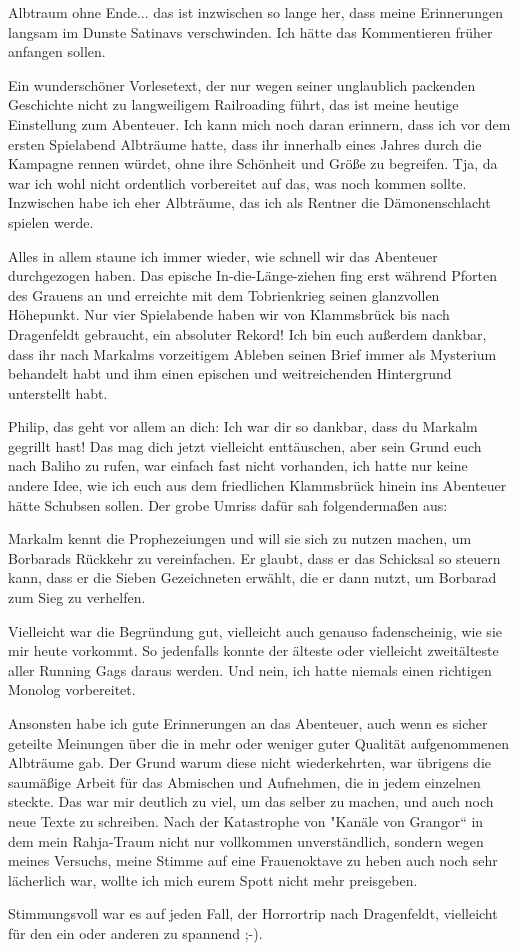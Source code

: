 \documentclass[11pt]{scrreprt}
\begin{document}
Albtraum ohne Ende... das ist inzwischen so lange her, dass meine Erinnerungen langsam im Dunste Satinavs verschwinden. Ich hätte das Kommentieren früher anfangen sollen.\par
Ein wunderschöner Vorlesetext, der nur wegen seiner unglaublich packenden Geschichte nicht zu langweiligem Railroading führt, das ist meine heutige Einstellung zum Abenteuer. Ich kann mich noch daran erinnern, dass ich vor dem ersten Spielabend Albträume hatte, dass ihr innerhalb eines Jahres durch die Kampagne rennen würdet, ohne ihre Schönheit und Größe zu begreifen. Tja, da war ich wohl nicht ordentlich vorbereitet auf das, was noch kommen sollte. Inzwischen habe ich eher Albträume, das ich als Rentner die Dämonenschlacht spielen werde.\par
Alles in allem staune ich immer wieder, wie schnell wir das Abenteuer durchgezogen haben. Das epische In-die-Länge-ziehen fing erst während Pforten des Grauens an und erreichte mit dem Tobrienkrieg seinen glanzvollen Höhepunkt. Nur vier Spielabende haben wir von Klammsbrück bis nach Dragenfeldt gebraucht, ein absoluter Rekord!
Ich bin euch außerdem dankbar, dass ihr nach Markalms vorzeitigem Ableben seinen Brief immer als Mysterium behandelt habt und ihm einen epischen und weitreichenden Hintergrund unterstellt habt.\par
Philip, das geht vor allem an dich: Ich war dir so dankbar, dass du Markalm gegrillt hast! Das mag dich jetzt vielleicht enttäuschen, aber sein Grund euch nach Baliho zu rufen, war einfach fast nicht vorhanden, ich hatte nur keine andere Idee, wie ich euch aus dem friedlichen Klammsbrück hinein ins Abenteuer hätte Schubsen sollen. Der grobe Umriss dafür sah folgendermaßen aus:\par
Markalm kennt die Prophezeiungen und will sie sich zu nutzen machen, um Borbarads Rückkehr zu vereinfachen. Er glaubt, dass er das Schicksal so steuern kann, dass er die Sieben Gezeichneten erwählt, die er dann nutzt, um Borbarad zum Sieg zu verhelfen.\par
Vielleicht war die Begründung gut, vielleicht auch genauso fadenscheinig, wie sie mir heute vorkommt. So jedenfalls konnte der älteste oder vielleicht zweitälteste aller Running Gags daraus werden. Und nein, ich hatte niemals einen richtigen Monolog vorbereitet.\par
Ansonsten habe ich gute Erinnerungen an das Abenteuer, auch wenn es sicher geteilte Meinungen über die in mehr oder weniger guter Qualität aufgenommenen Albträume gab. Der Grund warum diese nicht wiederkehrten, war übrigens die saumäßige Arbeit für das Abmischen und Aufnehmen, die in jedem einzelnen steckte. Das war mir deutlich zu viel, um das selber zu machen, und auch noch neue Texte zu schreiben. Nach der Katastrophe von "Kanäle von Grangor“ in dem mein Rahja-Traum nicht nur vollkommen unverständlich, sondern wegen meines Versuchs, meine Stimme auf eine Frauenoktave zu heben auch noch sehr lächerlich war, wollte ich mich eurem Spott nicht mehr preisgeben.\par
Stimmungsvoll war es auf jeden Fall, der Horrortrip nach Dragenfeldt, vielleicht für den ein oder anderen zu spannend ;-).\par
\end{document}
